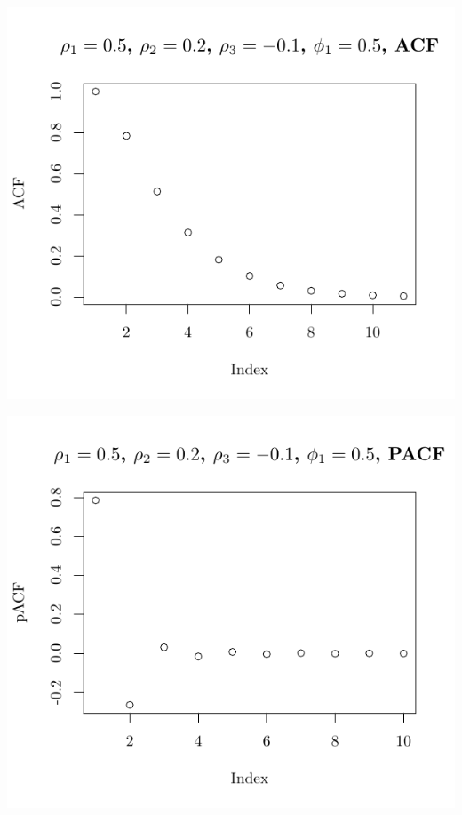 \documentclass[10pt]{paper}\usepackage[]{graphicx}\usepackage[]{color}
\makeatletter
\def\maxwidth{ %
  \ifdim\Gin@nat@width>\linewidth
    \linewidth
  \else
    \Gin@nat@width
  \fi
}
\newenvironment{knitrout}{}{} %
\makeatother
\begin{document}
\begin{knitrout}
{\centering \includegraphics[width=\maxwidth]{figure/graphics-plotter-139} 

}




{\centering \includegraphics[width=\maxwidth]{figure/graphics-plotter-140} 

}





\end{knitrout}
\end{document}
